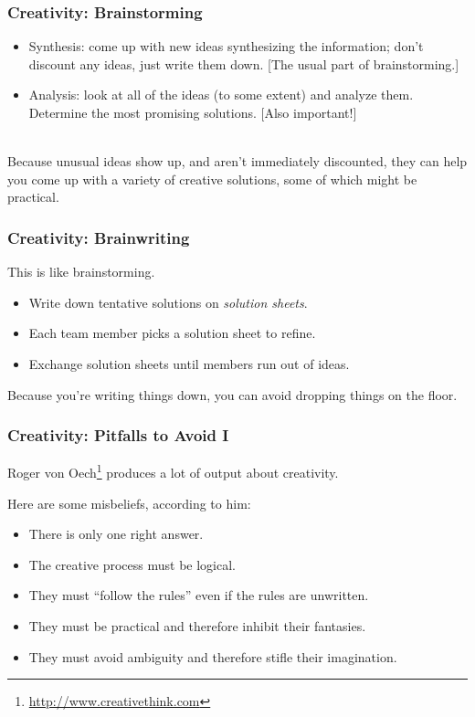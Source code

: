 \begin{frame}
\frametitle{Creativity: Brainstorming}

\begin{changemargin}{1cm}
\begin{itemize}
\item Synthesis: come up with new ideas synthesizing the information;
  don't discount any ideas, just write them down. [The usual part of
    brainstorming.]\\[1em]
\item Analysis: look at all of the ideas (to some extent) and analyze them. Determine the most promising solutions. [Also important!]
\end{itemize}
~\\

Because unusual ideas show up, and aren't immediately discounted, 
they can help you come up with a variety of creative solutions, some of 
which might be practical.
\end{changemargin}
\end{frame}

\begin{frame}
\frametitle{Creativity: Brainwriting}

\begin{changemargin}{1cm}
This is like brainstorming.

\begin{itemize}
\item Write down tentative solutions on \emph{solution sheets}.
\item Each team member picks a solution sheet to refine.
\item Exchange solution sheets until members run out of ideas.
\end{itemize}
Because you're writing things down, you can avoid dropping things on the floor.
\end{changemargin}

\end{frame}

\begin{frame}
\frametitle{Creativity: Pitfalls to Avoid I}

\begin{changemargin}{1cm}
Roger von 
Oech\footnote{\url{http://www.creativethink.com}} produces a lot of
output about creativity. 

Here are some misbeliefs, according to him:
\begin{itemize}
\item There is only one right answer.
\item The creative process must be logical.
\item They must ``follow the rules'' even if the rules are unwritten.
\item They must be practical and therefore inhibit their fantasies.
\item They must avoid ambiguity and therefore stifle their imagination.
\end{itemize}
\end{changemargin}

\end{frame}

